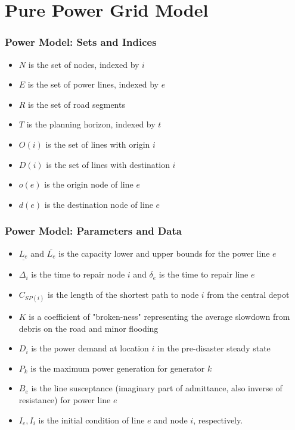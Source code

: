 \documentclass[t, pdftex]{beamer}
\begin{document}
	\section{Pure Power Grid Model}
	\begin{frame}
	\frametitle{Power Model: Sets and Indices}
	\begin{itemize}
		\item $N$ is the set of nodes, indexed by $i$
		\item $E$ is the set of power lines, indexed by $e$
		\item $R$ is the set of road segments
		\item $T$ is the planning horizon, indexed by $t$
		\item $O(i)$ is the set of lines with origin $i$
		\item $D(i)$ is the set of lines with destination $i$
		\item $o(e)$ is the origin node of line $e$
		\item $d(e)$ is the destination node of line $e$
	\end{itemize}
	
\end{frame}
\begin{frame}
\frametitle{Power Model: Parameters and Data}
\begin{itemize}
\item $\underline{L_e}$ and $\overline{L_e}$ is the capacity lower and upper bounds for the power line $e$
\item $\Delta_{i}$ is the time to repair node $i$ and $\delta_{e}$ is the time to repair line $e$
\item $C_{SP(i)}$ is the length of the shortest path to node $i$ from the central depot
\item $K$ is a coefficient of "broken-ness" representing the average slowdown from debris on the road and minor flooding
\item $D_i$ is the power demand at location $i$ in the pre-disaster steady state
\item $P_k$ is the maximum power generation for generator $k$
\item $B_e$ is the line susceptance (imaginary part of admittance, also inverse of resistance) for power line $e$
\item $I_e, I_i$ is the initial condition of line $e$ and node $i$, respectively.
\end{itemize}
\end{frame}
\end{document}
